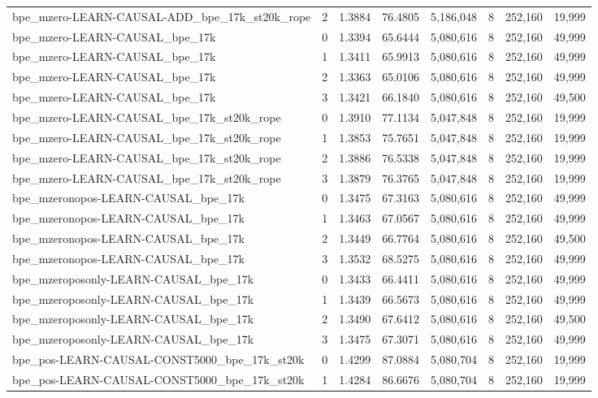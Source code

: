 \begin{tabular}{lrrrrrrr}
bpe\_mzero-LEARN-CAUSAL-ADD\_bpe\_17k\_st20k\_rope & 2 & 1.3884 & 76.4805 & 5,186,048 & 8 & 252,160 & 19,999 \\
bpe\_mzero-LEARN-CAUSAL\_bpe\_17k & 0 & 1.3394 & 65.6444 & 5,080,616 & 8 & 252,160 & 49,999 \\
bpe\_mzero-LEARN-CAUSAL\_bpe\_17k & 1 & 1.3411 & 65.9913 & 5,080,616 & 8 & 252,160 & 49,999 \\
bpe\_mzero-LEARN-CAUSAL\_bpe\_17k & 2 & 1.3363 & 65.0106 & 5,080,616 & 8 & 252,160 & 49,999 \\
bpe\_mzero-LEARN-CAUSAL\_bpe\_17k & 3 & 1.3421 & 66.1840 & 5,080,616 & 8 & 252,160 & 49,500 \\
bpe\_mzero-LEARN-CAUSAL\_bpe\_17k\_st20k\_rope & 0 & 1.3910 & 77.1134 & 5,047,848 & 8 & 252,160 & 19,999 \\
bpe\_mzero-LEARN-CAUSAL\_bpe\_17k\_st20k\_rope & 1 & 1.3853 & 75.7651 & 5,047,848 & 8 & 252,160 & 19,999 \\
bpe\_mzero-LEARN-CAUSAL\_bpe\_17k\_st20k\_rope & 2 & 1.3886 & 76.5338 & 5,047,848 & 8 & 252,160 & 19,999 \\
bpe\_mzero-LEARN-CAUSAL\_bpe\_17k\_st20k\_rope & 3 & 1.3879 & 76.3765 & 5,047,848 & 8 & 252,160 & 19,999 \\
bpe\_mzeronopos-LEARN-CAUSAL\_bpe\_17k & 0 & 1.3475 & 67.3163 & 5,080,616 & 8 & 252,160 & 49,999 \\
bpe\_mzeronopos-LEARN-CAUSAL\_bpe\_17k & 1 & 1.3463 & 67.0567 & 5,080,616 & 8 & 252,160 & 49,999 \\
bpe\_mzeronopos-LEARN-CAUSAL\_bpe\_17k & 2 & 1.3449 & 66.7764 & 5,080,616 & 8 & 252,160 & 49,500 \\
bpe\_mzeronopos-LEARN-CAUSAL\_bpe\_17k & 3 & 1.3532 & 68.5275 & 5,080,616 & 8 & 252,160 & 49,999 \\
bpe\_mzeroposonly-LEARN-CAUSAL\_bpe\_17k & 0 & 1.3433 & 66.4411 & 5,080,616 & 8 & 252,160 & 49,999 \\
bpe\_mzeroposonly-LEARN-CAUSAL\_bpe\_17k & 1 & 1.3439 & 66.5673 & 5,080,616 & 8 & 252,160 & 49,999 \\
bpe\_mzeroposonly-LEARN-CAUSAL\_bpe\_17k & 2 & 1.3490 & 67.6412 & 5,080,616 & 8 & 252,160 & 49,500 \\
bpe\_mzeroposonly-LEARN-CAUSAL\_bpe\_17k & 3 & 1.3475 & 67.3071 & 5,080,616 & 8 & 252,160 & 49,999 \\
bpe\_pos-LEARN-CAUSAL-CONST5000\_bpe\_17k\_st20k & 0 & 1.4299 & 87.0884 & 5,080,704 & 8 & 252,160 & 19,999 \\
bpe\_pos-LEARN-CAUSAL-CONST5000\_bpe\_17k\_st20k & 1 & 1.4284 & 86.6676 & 5,080,704 & 8 & 252,160 & 19,999 \\

\end{tabular}
